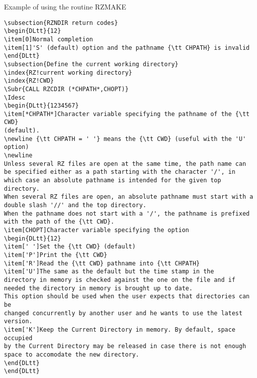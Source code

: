 \begin{XMPt}{Example of using the routine RZMAKE}
\begin{verbatim}
\subsection{RZNDIR return codes}
\begin{DLtt}{12}
\item[0]Normal completion
\item[1]'S' (default) option and the pathname {\tt CHPATH} is invalid
\end{DLtt}
\subsection{Define the current working directory}
\index{RZ!current working directory}
\index{RZ!CWD}
\Subr{CALL RZCDIR (*CHPATH*,CHOPT)}
\Idesc
\begin{DLtt}{1234567}
\item[*CHPATH*]Character variable specifying the pathname of the {\tt CWD}
(default).
\newline {\tt CHPATH = ' '} means the {\tt CWD} (useful with the 'U' option)
\newline
Unless several RZ files are open at the same time, the path name can
be specified either as a path starting with the character '/', in
which case an absolute pathname is intended for the given top directory.
When several RZ files are open, an absolute pathname must start with a
double slash '//' and the top directory.
When the pathname does not start with a '/', the pathname is prefixed
with the path of the {\tt CWD}.
\item[CHOPT]Character variable specifying the option
\begin{DLtt}{12}
\item[' ']Set the {\tt CWD} (default)
\item['P']Print the {\tt CWD}
\item['R']Read the {\tt CWD} pathname into {\tt CHPATH}
\item['U']The same as the default but the time stamp in the
directory in memory is checked against the one on the file and if
needed the directory in memory is brought up to date.
This option should be used when the user expects that directories can be
changed concurrently by another user and he wants to use the latest
version.
\item['K']Keep the Current Directory in memory. By default, space occupied
by the Current Directory may be released in case there is not enough
space to accomodate the new directory.
\end{DLtt}
\end{DLtt}

\end{verbatim}
\end{XMPt}

